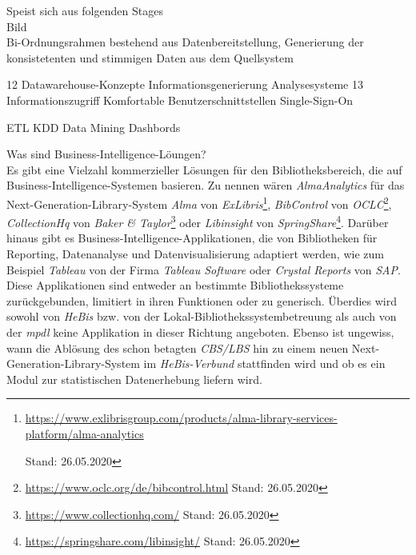 \clearpage
Speist sich aus folgenden Stages\\
Bild\\

Bi-Ordnungsrahmen bestehend aus
Datenbereitstellung,
              Generierung der konsistetenten und stimmigen Daten aus dem Quellsystem
 
12          Datawarehouse-Konzepte
Informationsgenerierung
              Analysesysteme
13
Informationszugriff
              Komfortable Benutzerschnittstellen
              Single-Sign-On

ETL
KDD
Data Mining
Dashbords 


Was sind Business-Intelligence-Löungen?\\
Es gibt eine Vielzahl kommerzieller Lösungen für den Bibliotheksbereich, die auf Business-Intelligence-Systemen basieren.
Zu nennen wären \textit{AlmaAnalytics} für das Next-Generation-Library-System \textit{Alma} von \textit{ExLibris}\footnote{\url{https://www.exlibrisgroup.com/products/alma-library-services-platform/alma-analytics}

Stand: 26.05.2020}, \textit{BibControl} von \textit{OCLC}\footnote{\url{https://www.oclc.org/de/bibcontrol.html} Stand: 26.05.2020},
\textit{CollectionHq} von \textit{Baker \& Taylor}\footnote{\url{https://www.collectionhq.com/} Stand: 26.05.2020} oder \textit{Libinsight} von \textit{SpringShare}\footnote{\url{https://springshare.com/libinsight/} Stand: 26.05.2020}.
Darüber hinaus gibt es Business-Intelligence-Applikationen, die von
Bibliotheken für Reporting, Datenanalyse und Datenvisualisierung adaptiert werden,
wie zum Beispiel \textit{Tableau} von der Firma \textit{Tableau Software} oder
\textit{Crystal Reports} von \textit{SAP}.
Diese Applikationen sind entweder
an bestimmte Bibliothekssysteme zurückgebunden, limitiert in ihren
Funktionen\cite{golas_statistische_2018} oder zu generisch.
Überdies wird sowohl von \textit{HeBis} bzw. von der
Lokal-Bibliothekssystembetreuung als auch von der \textit{mpdl} keine Applikation
in dieser Richtung angeboten.
Ebenso ist ungewiss, wann die Ablösung des schon betagten \textit{CBS/LBS} hin zu
einem neuen Next-Generation-Library-System im \textit{HeBis-Verbund} stattfinden wird und ob
es ein Modul zur statistischen Datenerhebung liefern wird.
